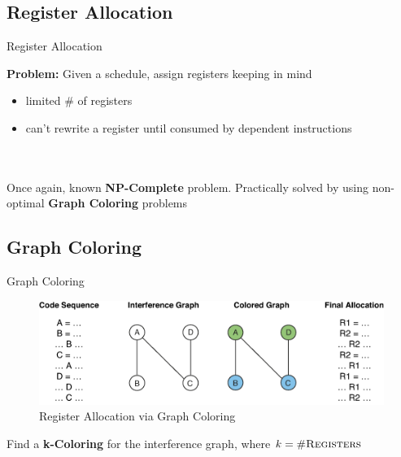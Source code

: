 \documentclass{beamer}
\begin{document}
\begin{darkframes}
\section{Register Allocation}

\begin{frame}{Register Allocation}

	{\bf \color{cyan} Problem:} Given a schedule, assign registers keeping in mind
	\begin{itemize}
		\item limited \# of registers
		\item can't rewrite a register until consumed by dependent instructions
	\end{itemize}
	\qquad \\
	\qquad \\
	Once again, known {\bf \color{green} NP-Complete} problem. Practically solved by using non-optimal {\bf \color{green} Graph Coloring} problems 
\end{frame}

\subsection{Graph Coloring}
\begin{frame}{Graph Coloring}
\begin{figure}
\includegraphics[scale=0.5]{figures/nshape}
\caption{Register Allocation via Graph Coloring}
\end{figure}
Find a {\bf \color{green} k-Coloring} for the interference graph, where {\bf \color{green} $k = \#\textsc{Registers}$}
\end{frame}


\end{darkframes}
\end{document}
